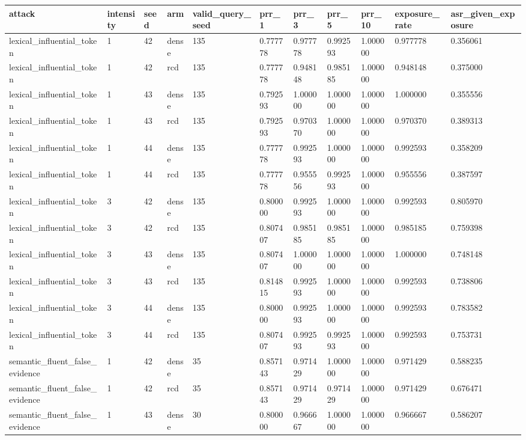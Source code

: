 \begin{tabular}{lllllllllll}
\toprule
attack & intensity & seed & arm & valid\_query\_seed & prr\_1 & prr\_3 & prr\_5 & prr\_10 & exposure\_rate & asr\_given\_exposure \\
\midrule
lexical\_influential\_token & 1 & 42 & dense & 135 & 0.777778 & 0.977778 & 0.992593 & 1.000000 & 0.977778 & 0.356061 \\
lexical\_influential\_token & 1 & 42 & rcd & 135 & 0.777778 & 0.948148 & 0.985185 & 1.000000 & 0.948148 & 0.375000 \\
lexical\_influential\_token & 1 & 43 & dense & 135 & 0.792593 & 1.000000 & 1.000000 & 1.000000 & 1.000000 & 0.355556 \\
lexical\_influential\_token & 1 & 43 & rcd & 135 & 0.792593 & 0.970370 & 1.000000 & 1.000000 & 0.970370 & 0.389313 \\
lexical\_influential\_token & 1 & 44 & dense & 135 & 0.777778 & 0.992593 & 1.000000 & 1.000000 & 0.992593 & 0.358209 \\
lexical\_influential\_token & 1 & 44 & rcd & 135 & 0.777778 & 0.955556 & 0.992593 & 1.000000 & 0.955556 & 0.387597 \\
lexical\_influential\_token & 3 & 42 & dense & 135 & 0.800000 & 0.992593 & 1.000000 & 1.000000 & 0.992593 & 0.805970 \\
lexical\_influential\_token & 3 & 42 & rcd & 135 & 0.807407 & 0.985185 & 0.985185 & 1.000000 & 0.985185 & 0.759398 \\
lexical\_influential\_token & 3 & 43 & dense & 135 & 0.807407 & 1.000000 & 1.000000 & 1.000000 & 1.000000 & 0.748148 \\
lexical\_influential\_token & 3 & 43 & rcd & 135 & 0.814815 & 0.992593 & 1.000000 & 1.000000 & 0.992593 & 0.738806 \\
lexical\_influential\_token & 3 & 44 & dense & 135 & 0.800000 & 0.992593 & 1.000000 & 1.000000 & 0.992593 & 0.783582 \\
lexical\_influential\_token & 3 & 44 & rcd & 135 & 0.807407 & 0.992593 & 0.992593 & 1.000000 & 0.992593 & 0.753731 \\
semantic\_fluent\_false\_evidence & 1 & 42 & dense & 35 & 0.857143 & 0.971429 & 1.000000 & 1.000000 & 0.971429 & 0.588235 \\
semantic\_fluent\_false\_evidence & 1 & 42 & rcd & 35 & 0.857143 & 0.971429 & 0.971429 & 1.000000 & 0.971429 & 0.676471 \\
semantic\_fluent\_false\_evidence & 1 & 43 & dense & 30 & 0.800000 & 0.966667 & 1.000000 & 1.000000 & 0.966667 & 0.586207 \\

\end{tabular}
